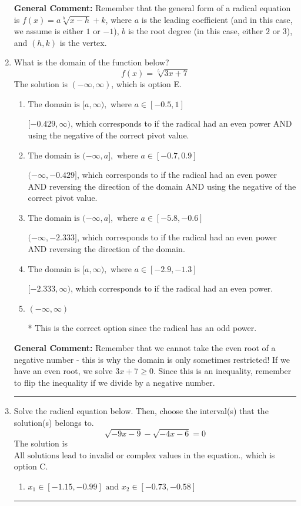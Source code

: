 \documentclass{extbook}[14pt]
\newcommand{\litem}[1]{\item #1

\rule{\textwidth}{0.4pt}}
\begin{document}
\begin{enumerate}
{\textbf{General Comment:} Remember that the general form of a radical equation is $ f(x) = a \sqrt[b]{x - h} + k$, where $a$ is the leading coefficient (and in this case, we assume is either $1$ or $-1$), $b$ is the root degree (in this case, either $2$ or $3$), and $(h, k)$ is the vertex.
}
\litem{
What is the domain of the function below?
\[ f(x) = \sqrt[5]{3 x + 7} \]The solution is \( (-\infty, \infty) \), which is option E.\begin{enumerate}[label=\Alph*.]
\item \( \text{The domain is } [a, \infty), \text{   where } a \in [-0.5, 1] \)

$[-0.429, \infty)$, which corresponds to if the radical had an even power AND using the negative of the correct pivot value.
\item \( \text{The domain is } (-\infty, a], \text{   where } a \in [-0.7, 0.9] \)

$(-\infty, -0.429]$, which corresponds to if the radical had an even power AND reversing the direction of the domain AND using the negative of the correct pivot value.
\item \( \text{The domain is } (-\infty, a], \text{   where } a \in [-5.8, -0.6] \)

$(-\infty, -2.333]$, which corresponds to if the radical had an even power AND reversing the direction of the domain.
\item \( \text{The domain is } [a, \infty), \text{   where } a \in [-2.9, -1.3] \)

$[-2.333, \infty)$, which corresponds to if the radical had an even power.
\item \( (-\infty, \infty) \)

* This is the correct option since the radical has an odd power.
\end{enumerate}

\textbf{General Comment:} Remember that we cannot take the even root of a negative number - this is why the domain is only sometimes restricted! If we have an even root, we solve $3 x + 7 \geq 0$. Since this is an inequality, remember to flip the inequality if we divide by a negative number.
}
\litem{
Solve the radical equation below. Then, choose the interval(s) that the solution(s) belongs to.
\[ \sqrt{-9 x - 9} - \sqrt{-4 x - 6} = 0 \]The solution is \( \text{All solutions lead to invalid or complex values in the equation.} \), which is option C.\begin{enumerate}[label=\Alph*.]
\item \( x_1 \in [-1.15, -0.99] \text{ and } x_2 \in [-0.73,-0.58] \)


\end{enumerate}}
\end{enumerate}
\end{document}
